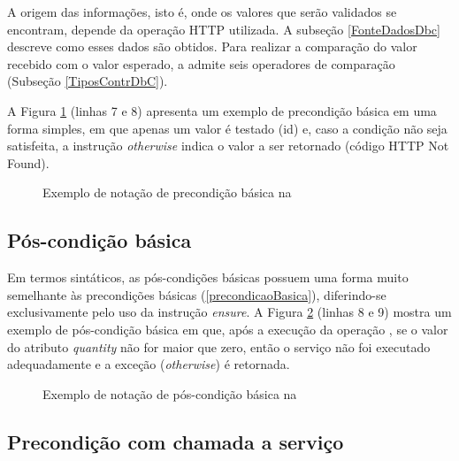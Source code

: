 A origem das informações, isto é, onde os valores que serão validados se
encontram, depende da operação HTTP utilizada. A subseção \ref{FonteDadosDbc} descreve como esses
dados são obtidos. Para realizar a comparação do valor recebido com o valor
esperado, a \neoidl{} admite seis operadores de comparação (Subseção
\ref{TiposContrDbC}).

A Figura \ref{lst:DBCPreCondBasica} (linhas 7 e 8) apresenta um exemplo de
precondição básica em uma forma simples, em que apenas um valor é testado (id)
e, caso a condição não seja satisfeita, a instrução \emph{otherwise} indica o
valor a ser retornado (código HTTP Not Found). 	

\begin{figure}[htb]
\begin{small}

\end{small}
\caption{Exemplo de notação de precondição básica na \neoidl{}}
\label{lst:DBCPreCondBasica}
\end{figure} 



\subsection{Pós-condição básica}

Em termos sintáticos, as pós-condições básicas possuem uma forma muito
semelhante às precondições básicas (\ref{precondicaoBasica}), diferindo-se
exclusivamente pelo uso da instrução \emph{ensure}. A Figura
\ref{lst:DBCPosCondBasica} (linhas 8 e 9) mostra um exemplo de pós-condição
básica em que, após a execução da operação , se o valor do atributo
\emph{quantity} não for maior que zero, então o serviço não foi executado adequadamente e a exceção
(\emph{otherwise}) é retornada.

\begin{figure}[htb]
\begin{small}

\end{small}
\caption{Exemplo de notação de pós-condição básica na \neoidl{}}
\label{lst:DBCPosCondBasica}
\end{figure} 


\subsection{Precondição com chamada a serviço}

